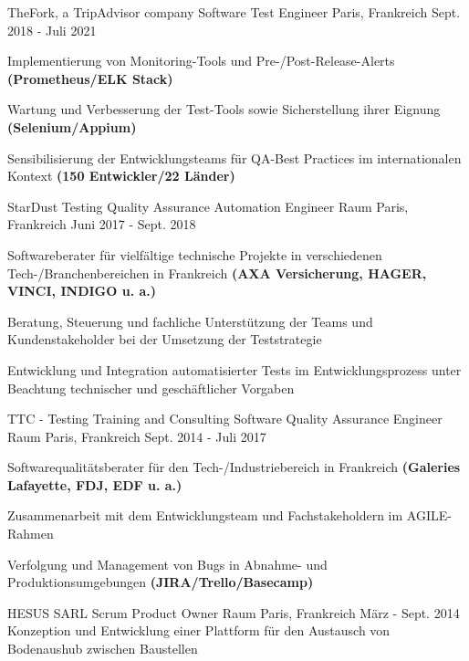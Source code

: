 \begin{cventries}
  \cventry
  {TheFork, a TripAdvisor company }
  {Software Test Engineer}
  {Paris, Frankreich}
  {Sept. 2018 - Juli 2021}
  {
    \begin{cvitems}
      \item{Implementierung von Monitoring-Tools und Pre-/Post-Release-Alerts \textbf{(Prometheus/ELK Stack)}}
      \item{Wartung und Verbesserung der Test-Tools sowie Sicherstellung ihrer Eignung \textbf{(Selenium/Appium)}}
      \item{Sensibilisierung der Entwicklungsteams für QA-Best Practices im internationalen Kontext \textbf{(150 Entwickler/22 Länder)}}
    \end{cvitems}
    \vspace{0.75em}
  }

  \cventry
  {StarDust Testing }
  {Quality Assurance Automation Engineer}
  {Raum Paris, Frankreich}
  {Juni 2017 - Sept. 2018}
  {
    \begin{cvitems}
      \item{Softwareberater für vielfältige technische Projekte in verschiedenen Tech-/Branchenbereichen in Frankreich \textbf{(AXA Versicherung, HAGER, VINCI, INDIGO u. a.)}}
      \item{Beratung, Steuerung und fachliche Unterstützung der Teams und Kundenstakeholder bei der Umsetzung der Teststrategie}
      \item{Entwicklung und Integration automatisierter Tests im Entwicklungsprozess unter Beachtung technischer und geschäftlicher Vorgaben}
    \end{cvitems}
    \vspace{0.75em}
  }

  \cventry
  {TTC - Testing Training and Consulting }
  {Software Quality Assurance Engineer}
  {Raum Paris, Frankreich}
  {Sept. 2014 - Juli 2017}
  {
    \begin{cvitems}
      \item{Softwarequalitätsberater für den Tech-/Industriebereich in Frankreich \textbf{(Galeries Lafayette, FDJ, EDF u. a.)}}
      \item{Zusammenarbeit mit dem Entwicklungsteam und Fachstakeholdern im AGILE-Rahmen}
      \item {Verfolgung und Management von Bugs in Abnahme- und Produktionsumgebungen \textbf{(JIRA/Trello/Basecamp)}}
    \end{cvitems}
    \vspace{0.75em}
  }

  \cventry
  {HESUS SARL }
  {Scrum Product Owner}
  {Raum Paris, Frankreich}
  {März - Sept. 2014}
  {Konzeption und Entwicklung einer Plattform für den Austausch von Bodenaushub zwischen Baustellen \vspace{0.75em}}

\end{cventries}
